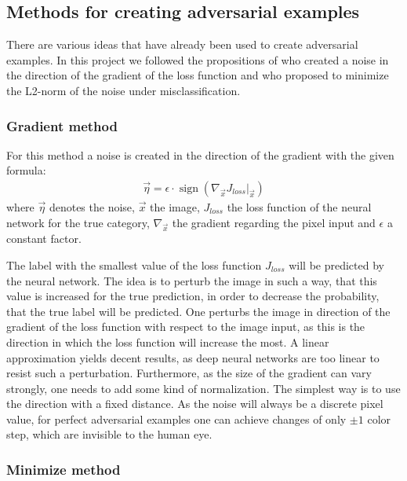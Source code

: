 \documentclass[%
 reprint,
 amsmath,amssymb,
 aps,
]{revtex4-1}
\begin{document}
\subsection{Methods for creating adversarial examples}

There are various ideas that have already been used to create adversarial examples. In this project we followed the propositions of \citeauthor{paperGrad} who created a noise in the direction of the gradient of the loss function and \citeauthor{paperMinimize} who proposed to minimize the L2-norm of the noise under misclassification.
\subsubsection*{Gradient method}

For this method a noise is created in the direction of the gradient with the given formula:
\begin{align*}
\vec{\eta} = \epsilon \cdot \operatorname{sign} \left( \nabla_{\vec{x}} J_{loss} \big \vert_{\vec{x}} \right)
\end{align*}
where $\vec{\eta}$ denotes the noise, $\vec{x}$ the image, $J_{loss}$ the loss function of the neural network for the true category,  $\nabla_{\vec{x}}$ the gradient regarding the pixel input and $\epsilon$ a constant factor.

The label with the smallest value of the loss function $J_{loss}$ will be predicted by the neural network. The idea is to perturb the image in such a way, that this value is increased for the true prediction, in order to decrease the probability, that the true label will be predicted. One perturbs the image in direction of the gradient of the loss function with respect to the image input, as this is the direction in which the loss function will increase the most. A linear approximation yields decent results, as deep neural networks are too linear to resist such a perturbation. Furthermore, as the size of the gradient can vary strongly, one needs to add some kind of normalization. The simplest way is to use the direction with a fixed distance. As the noise will always be a discrete pixel value, for perfect adversarial examples one can achieve changes of only $\pm 1$ color step, which are invisible to the human eye. \cite{paperGrad}

\subsubsection*{Minimize method}
\end{document}
